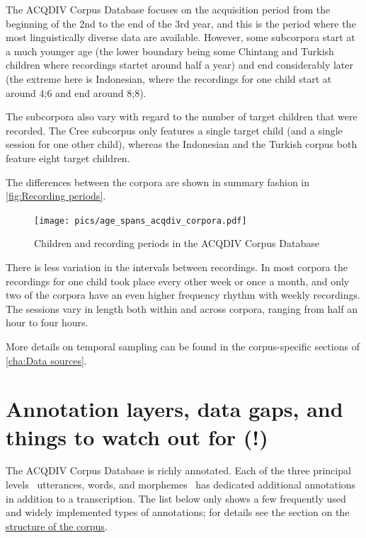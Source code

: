 \documentclass[a4paper, 11pt]{book}
\begin{document}
The ACQDIV Corpus Database focuses on the acquisition period from the beginning of the 2nd to the end of the 3rd year, and this is the period where the most linguistically diverse data are available. However, some subcorpora start at a much younger age (the lower boundary being some Chintang and Turkish children where recordings startet around half a year) and end considerably later (the extreme here is Indonesian, where the recordings for one child start at around 4;6 and end around 8;8). 

The subcorpora also vary with regard to the number of target children that were recorded. The Cree subcorpus only features a single target child (and a single session for one other child), whereas the Indonesian and the Turkish corpus both feature eight target children. 

The differences between the corpora are shown in summary fashion in \autoref{fig:Recording periods}. 

\begin{figure}
	\centering
	\texttt{[image: pics/age\_spans\_acqdiv\_corpora.pdf]}
	\caption{Children and recording periods in the ACQDIV Corpus Database}
	\label{fig:Recording periods}
\end{figure}

There is less variation in the intervals between recordings. In most corpora the recordings for one child took place every other week or once a month, and only two of the corpora have an even higher frequency rhythm with weekly recordings. The sessions vary in length both within and across corpora, ranging from half an hour to four hours. 

More details on temporal sampling can be found in the corpus-specific sections of \autoref{cha:Data sources}. 


\chapter{Annotation layers, data gaps, and things to watch out for (!)}
\label{sec:Annotation layers and data gaps}

The ACQDIV Corpus Database is richly annotated. Each of the three principal levels \textendash\ utterances, words, and morphemes \textendash\ has dedicated additional annotations in addition to a transcription. The list below only shows a few frequently used and widely implemented types of annotations; for details see the section on the \hyperref[sec:Structure of the corpus]{structure of the corpus}. 
\end{document}
